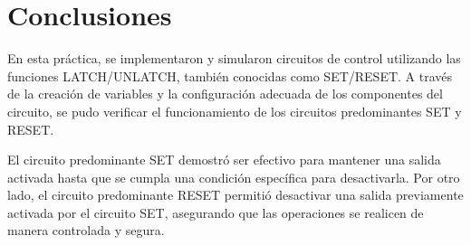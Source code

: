 \documentclass[12pt]{report}
\begin{document}
\chapter{Conclusiones}
En esta práctica, se implementaron y simularon circuitos de control utilizando las funciones LATCH/UNLATCH, también conocidas como SET/RESET. A través de la creación de variables y la configuración adecuada de los componentes del circuito, se pudo verificar el funcionamiento de los circuitos predominantes SET y RESET.

El circuito predominante SET demostró ser efectivo para mantener una salida activada hasta que se cumpla una condición específica para desactivarla. Por otro lado, el circuito predominante RESET permitió desactivar una salida previamente activada por el circuito SET, asegurando que las operaciones se realicen de manera controlada y segura.
\newpage
\end{document}
